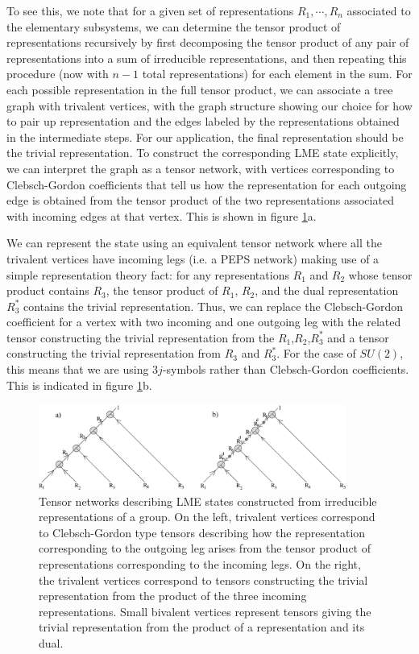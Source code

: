 \documentclass[12pt]{article}
\theoremstyle{definition}
\begin{document}
To see this, we note that for a given set of representations $R_1, \cdots, R_n$ associated to the elementary subsystems, we can determine the tensor product of representations recursively by first decomposing the tensor product of any pair of representations into a sum of irreducible representations, and then repeating this procedure (now with $n-1$ total representations) for each element in the sum. For each possible representation in the full tensor product, we can associate a tree graph with trivalent vertices, with the graph structure showing our choice for how to pair up representation and the edges labeled by the representations obtained in the intermediate steps. For our application, the final representation should be the trivial representation. To construct the corresponding LME state explicitly, we can interpret the graph as a tensor network, with vertices corresponding to Clebsch-Gordon coefficients that tell us how the representation for each outgoing edge is obtained from the tensor product of the two representations associated with incoming edges at that vertex. This is shown in figure \ref{fig:tensorBoth}a.

We can represent the state using an equivalent tensor network where all the trivalent vertices have incoming legs (i.e. a PEPS network) making use of a simple representation theory fact: for any representations $R_1$ and $R_2$ whose tensor product contains $R_3$, the tensor product of $R_1$, $R_2$, and the dual representation $R_3^*$ contains the trivial representation. Thus, we can replace the Clebsch-Gordon coefficient for a vertex with two incoming and one outgoing leg with the related tensor constructing the trivial representation from the $R_1$,$R_2$,$R_3^*$ and a tensor constructing the trivial representation from $R_3$ and $R_3^*$. For the case of $SU(2)$, this means that we are using $3j$-symbols rather than Clebsch-Gordon coefficients. This is indicated in figure \ref{fig:tensorBoth}b.

\begin{figure} 
\centering
\includegraphics[width=0.9\textwidth]{tensorBoth.eps}
\caption{Tensor networks describing LME states constructed from irreducible representations of a group. On the left, trivalent vertices correspond to Clebsch-Gordon type tensors describing how the representation corresponding to the outgoing leg arises from the tensor product of representations corresponding to the incoming legs. On the right, the trivalent vertices correspond to tensors constructing the trivial representation from the product of the three incoming representations. Small bivalent vertices represent tensors giving the trivial representation from the product of a representation and its dual.}
\label{fig:tensorBoth}
\end{figure}
\end{document}
